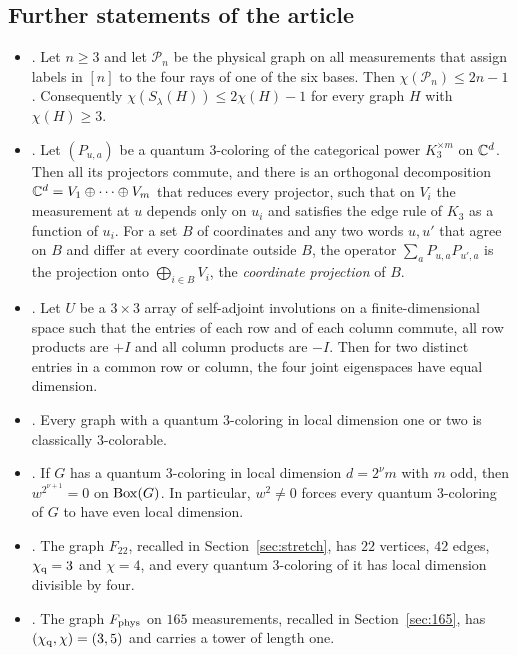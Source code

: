 \subsection{Further statements of the article}\label{sec:imports}

\begin{itemize}
\item[(Z1)] \cite[Proposition~A.1]{Z}. Let $n\ge3$ and let $\mathcal P_n$ be the physical graph on all measurements that assign labels in $[n]$ to the four rays of one of the six bases. Then $\chi(\mathcal P_n)\le2n-1$. Consequently $\chi(S_\lambda(H))\le2\chi(H)-1$ for every graph $H$ with $\chi(H)\ge3$.
\item[(Z2)] \cite[Lemma~4.2 and Facts~3 and~4 of Section~4.1]{Z}. Let $(P_{u,a})$ be a quantum $3$-coloring of the categorical power $K_3^{\times m}$ on $\mathbb C^d$. Then all its projectors commute, and there is an orthogonal decomposition $\mathbb C^d=V_1\oplus\cdots\oplus V_m$ that reduces every projector, such that on $V_i$ the measurement at $u$ depends only on $u_i$ and satisfies the edge rule of $K_3$ as a function of $u_i$. For a set $B$ of coordinates and any two words $u,u'$ that agree on $B$ and differ at every coordinate outside $B$, the operator $\sum_aP_{u,a}P_{u',a}$ is the projection onto $\bigoplus_{i\in B}V_i$, the \emph{coordinate projection} of $B$.
\item[(Z3)] \cite[Lemma~4.3]{Z}. Let $U$ be a $3\times3$ array of self-adjoint involutions on a finite-dimensional space such that the entries of each row and of each column commute, all row products are $+I$ and all column products are $-I$. Then for two distinct entries in a common row or column, the four joint eigenspaces have equal dimension.
\item[(Z4)] \cite[Theorem~5.5(a)]{Z}. Every graph with a quantum $3$-coloring in local dimension one or two is classically $3$-colorable.
\item[(Z5)] \cite[Proposition~5.8]{Z}. If $G$ has a quantum $3$-coloring in local dimension $d=2^\nu m$ with $m$ odd, then $w^{2^{\nu+1}}=0$ on $\operatorname{Box}(G)$. In particular, $w^2\ne0$ forces every quantum $3$-coloring of $G$ to have even local dimension.
\item[(Z6)] \cite[Proposition~6.1 and Proposition~C.1]{Z}. The graph $F_{22}$, recalled in Section~\ref{sec:stretch}, has $22$ vertices, $42$ edges, $\chi_{\mathrm q}=3$ and $\chi=4$, and every quantum $3$-coloring of it has local dimension divisible by four.
\item[(Z7)] \cite[Theorem~6.2 and Appendix~E]{Z}. The graph $F_{\rm phys}$ on $165$ measurements, recalled in Section~\ref{sec:165}, has $(\chi_{\mathrm q},\chi)=(3,5)$ and carries a tower of length one.
\end{itemize}
